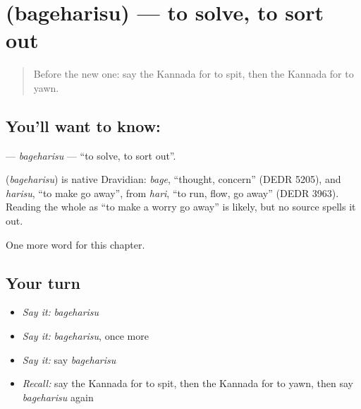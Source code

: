 \section[\texorpdfstring{\kn{ಬಗೆಹರಿಸು} (bageharisu)}{ಬಗೆಹರಿಸು (bageharisu)}]{ (bageharisu) — to solve, to sort out}

\label{lesson:KA-C279-bageharisu}



\begin{quote}
Before the new one: say the Kannada for to spit, then the Kannada for to yawn.
\end{quote}

\subsection*{You'll want to know: }
\textbf{} — \emph{bageharisu} — \textquotedblleft{}to solve, to sort out\textquotedblright{}.

\begin{cousinweb}
\textbf{} (\emph{bageharisu}) is native Dravidian: \emph{bage}, \textquotedblleft{}thought, concern\textquotedblright{} (DEDR 5205), and \emph{harisu}, \textquotedblleft{}to make go away\textquotedblright{}, from \emph{hari}, \textquotedblleft{}to run, flow, go away\textquotedblright{} (DEDR 3963). Reading the whole as \textquotedblleft{}to make a worry go away\textquotedblright{} is likely, but no source spells it out.
\end{cousinweb}

\begin{grammarlens}[title={What you've built}]
One more word for this chapter.
\end{grammarlens}

\subsection*{Your turn}
\begin{itemize}
\raggedright
  \item \emph{Say it:} \emph{bageharisu}
  \item \emph{Say it:} \emph{bageharisu}, once more
  \item \emph{Say it:} say \emph{bageharisu}
  \item \emph{Recall:} say the Kannada for to spit, then the Kannada for to yawn, then say \emph{bageharisu} again
\end{itemize}

